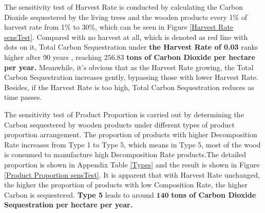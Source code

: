 \documentclass{mcmthesis}
\numberwithin{figure}{section}
\numberwithin{table}{section}
\numberwithin{equation}{section}
\begin{document}


The sensitivity test of Harvest Rate is conducted by calculating the Carbon Dioxide
sequestered by the living trees and the wooden products every 1\% of 
harvest rate from 1\% to 30\%, which can be seen in Figure \ref{Harvest Rate sensTest}.
Compared with no harvest at all, which is denoted as red line with dots on it, 
Total Carbon Sequestration under \textbf{the Harvest Rate of 0.03} ranks higher after 90 years
, reaching $ \bm{256.83} $  \textbf{tons of Carbon Dioxide per hectare per year.}
Meanwhile, it's obvious that as the Harvest Rate growing, the Total Carbon Sequestration
increases gently, bypassing those with lower Harvest Rate. Besides, if the Harvest 
Rate is too high, Total Carbon Sequestration reduces as time passes. 
\par
The sensitivity test of Product Proportion is carried out by determining the 
Carbon sequestered by wooden products under different types of product proportion
arrangement. The proportion of products with higher Decomposition Rate increases
from Type 1 to Type 5, which means in Type 5, most of the wood is consumed to manufacture
high Decomposition Rate products.The detailed proportion is shown in 
Appendix Table \ref{Types} and the result is shown in Figure \ref{Product Proportion sensTest}.
It is apparent that with Harvest Rate unchanged, the higher the proportion of
products with low Composition Rate, the higher Carbon is sequestered. \textbf{Type 5}
leads to around $ \bm{140} $\textbf{ tons of Carbon Dioxide Sequestration per hectare per year.} 
\end{document}
